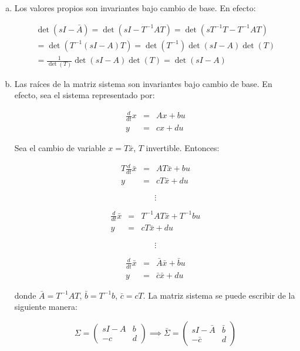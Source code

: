 \documentclass[12pt]{article}
\numberwithin{equation}{subsection}
\begin{document}
\begin{enumerate}[i)]
\begin{enumerate}[a)]
\item Los valores propios son invariantes bajo cambio de base. En efecto:

\begin{multline}
\det{(sI - \bar{A})} = \det{(sI - T^{-1} A T)} = \det{(s T^{-1} T - T^{-1} A T)} \\
= \det{(T^{-1} (sI - A) T)} = \det{(T^{-1})} \det{(sI - A)} \det{(T)} \\
= \frac{1}{\det{(T)}} \det{(sI - A)} \det{(T)} = \det{(sI - A)} \nonumber
\end{multline}

\item Las raíces de la matriz sistema son invariantes bajo cambio de base. En efecto, sea el sistema representado por:

\begin{eqnarray}
\frac{d}{dt} x & = & A x + b u \nonumber \\
y & = & c x + d u \nonumber
\end{eqnarray}

Sea el cambio de variable $x = T \bar{x}$, $T$ invertible. Entonces:

\begin{eqnarray}
T \frac{d}{dt} \bar{x} & = & A T \bar{x} + b u \nonumber \\
y & = & c T \bar{x} + d u \nonumber
\end{eqnarray}

\begin{equation}
\vdots \nonumber
\end{equation}

\begin{eqnarray}
\frac{d}{dt} \bar{x} & = & T^{-1} A T \bar{x} + T^{-1} b u \nonumber \\
y & = & c T \bar{x} + d u \nonumber
\end{eqnarray}

\begin{equation}
\vdots \nonumber
\end{equation}

\begin{eqnarray}
\frac{d}{dt} \bar{x} & = & \bar{A} \bar{x} + \bar{b} u \nonumber \\
y & = & \bar{c} \bar{x} + d u
\end{eqnarray}

donde $\bar{A} = T^{-1} A T$, $\bar{b} = T^{-1} b$, $\bar{c} = c T$. La matriz sistema se puede escribir de la siguiente manera:

\begin{equation}
\Sigma =
\begin{pmatrix}
sI - A & b \\
-c & d
\end{pmatrix}
\implies
\bar{\Sigma} =
\begin{pmatrix}
sI - \bar{A} & \bar{b} \\
-\bar{c} & d
\end{pmatrix}
\end{equation}


\end{enumerate}
\end{enumerate}
\end{document}
